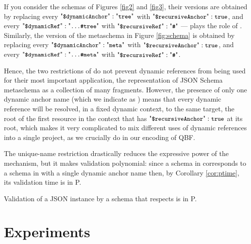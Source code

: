 If you consider the schemas of Figures \ref{fig2} and \ref{fig3}, their {\DNineteen} versions are obtained by replacing every
$\qdda : \qkw{tree}$ with $\qdrecA : \atrue$, and every $\qddref: \qkw{...\#tree}$ with $\qdrRef: \qkw{\#}$
---  plays the role of .
Similarly, the {\DNineteen} version of the
metaschema in Figure \ref{fig:schema} is obtained by replacing every
$\qdda : \qkw{meta}$ with $\qdrecA : \atrue$, and every $\qddref: \qkw{...\#meta}$ with $\qdrRef: \qkw{\#}$.

Hence, the two restrictions of {\DNineteen} do not prevent dynamic references from being used for their most important application,
 the representation of JSON Schema metaschema as a collection of many fragments.
However, the presence of only one dynamic anchor name (which we indicate as ) means that every dynamic reference will be resolved,
in a fixed dynamic context, to the same target, the root of the first resource in the context that has $\qdrecA: \atrue$ at its root,
which makes it very complicated to mix different uses of dynamic references into a single project,
as we crucially do in our encoding of QBF.

%
The unique-name restriction drastically reduces the expressive power of the mechanism, but
it makes validation polynomial: since a schema in {\DNineteen} corresponds to a schema in {\DTwenty} 
with a single dynamic anchor name then, by Corollary \ref{cor:ptime}, its validation time is in P.

\begin{corollary}\label{cor:nineteen}
Validation of a JSON instance by a schema that respects {\DNineteen} is in P.
\end{corollary}




\section{Experiments}\label{sec:experiments}

